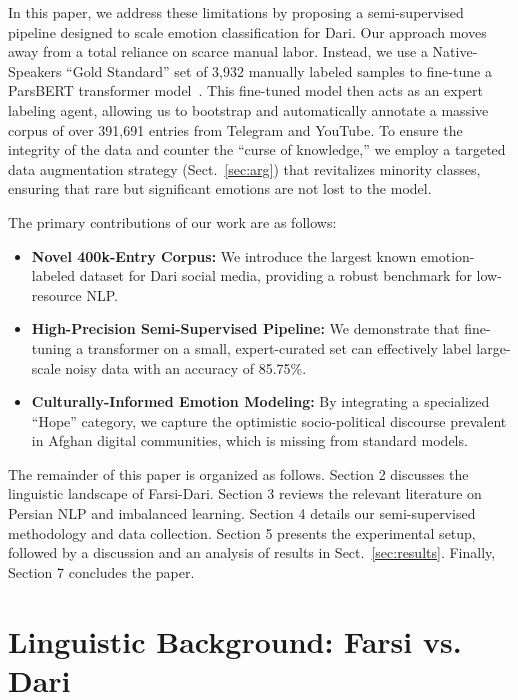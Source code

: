 \documentclass[runningheads]{llncs}
\begin{document}
In this paper, we address these limitations by proposing a semi-supervised 
pipeline designed to scale emotion classification for Dari. Our approach 
moves away from a total reliance on scarce manual labor. Instead, we use a
Native-Speakers ``Gold Standard'' set of 3,932 manually labeled samples to 
fine-tune a ParsBERT transformer model~\cite{farahani2021parsbert}. This 
fine-tuned model then acts as an expert labeling agent, allowing us to 
bootstrap and automatically annotate a massive corpus of over 391,691 
entries from Telegram and YouTube. To ensure the integrity of the data and 
counter the ``curse of knowledge,'' we employ a targeted data augmentation 
strategy (Sect.~\ref{sec:arg}) that revitalizes minority classes, ensuring that 
rare but significant emotions are not lost to the model.

The primary contributions of our work are as follows:

\begin{itemize}
    \item \textbf{Novel 400k-Entry Corpus:} We introduce the largest known 
    emotion-labeled dataset for Dari social media, providing a robust 
    benchmark for low-resource NLP.
    
    \item \textbf{High-Precision Semi-Supervised Pipeline:} We demonstrate 
    that fine-tuning a transformer on a small, expert-curated set can 
    effectively label large-scale noisy data with an accuracy of 85.75\%.
    
    \item \textbf{Culturally-Informed Emotion Modeling:} By integrating a 
    specialized ``Hope'' category, we capture the optimistic socio-political 
    discourse prevalent in Afghan digital communities, which is missing from 
    standard models.
\end{itemize}

The remainder of this paper is organized as follows. Section 2 discusses the 
linguistic landscape of Farsi-Dari. Section 3 reviews the relevant literature 
on Persian NLP and imbalanced learning. Section 4 details our semi-supervised 
methodology and data collection. Section 5 presents the experimental setup, 
followed by a discussion and an analysis of results in Sect.~\ref{sec:results}. Finally, 
Section 7 concludes the paper. 
\section{Linguistic Background: Farsi vs. Dari}
\end{document}
